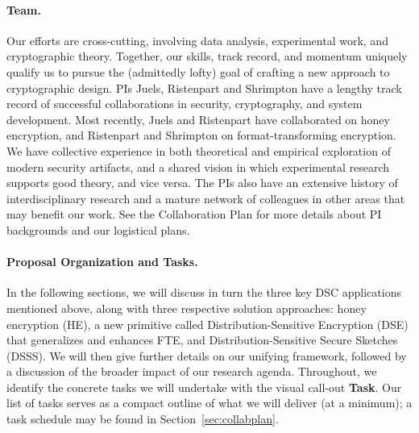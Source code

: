 {\paragraph{Team.} Our efforts are cross-cutting, involving data
analysis, experimental work, and cryptographic theory.   Together, our skills, track record, and momentum 
uniquely qualify us to pursue the
(admittedly lofty) goal of crafting a new approach to cryptographic design.
%
PIs Juels, Ristenpart and Shrimpton have a lengthy track record of
successful collaborations in security, cryptography, and system
development.  Most recently, Juels and Ristenpart have collaborated on
honey encryption, and Ristenpart and Shrimpton on format-transforming
encryption.  We have collective experience
in both theoretical and empirical exploration of modern security
artifacts, and a shared vision in which experimental research supports good
theory, and vice versa.  
The PIs also have an extensive history of interdisciplinary research and a mature network of colleagues in other areas that may
benefit our work.
See the Collaboration Plan for more details about PI backgrounds and our logistical plans.

\paragraph{Proposal Organization and Tasks.} In the following sections, we will
discuss in turn the three key DSC applications mentioned above, along with
three respective solution approaches: honey encryption (HE), a new primitive
called Distribution-Sensitive Encryption (DSE) that generalizes and enhances FTE,
and Distribution-Sensitive Secure Sketches (DSSS). We will then give further
details on our unifying framework, followed by a discussion of the broader
impact of our research agenda.  Throughout, we identify the concrete tasks we
will undertake with the visual call-out {\bf Task}.  Our list of tasks serves
as a compact outline of what we will deliver (at a minimum); a task schedule
may be found in Section~\ref{sec:collabplan}.

}

